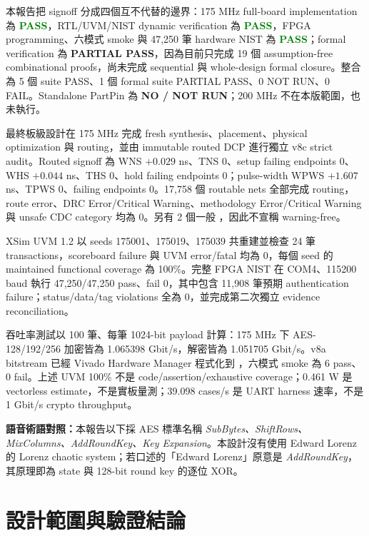 \documentclass[UTF8,fontset=none,11pt,a4paper]{ctexrep}
\newcommand{\pass}{\textcolor{green}{\textbf{PASS}}}
\newcommand{\code}[1]{\texttt{\detokenize{#1}}}
\begin{document}
本報告把 signoff 分成四個互不代替的邊界：175 MHz full-board implementation 為 \pass，RTL/UVM/NIST dynamic verification 為 \pass，FPGA programming、六模式 smoke 與 47,250 筆 hardware NIST 為 \pass；formal verification 為 \textbf{PARTIAL PASS}，因為目前只完成 19 個 assumption-free combinational proofs，尚未完成 sequential 與 whole-design formal closure。整合 \code{run_all} 為 5 個 suite PASS、1 個 formal suite PARTIAL PASS、0 NOT RUN、0 FAIL。Standalone PartPin 為 \textbf{NO / NOT RUN}；200 MHz 不在本版範圍，也未執行。

最終板級設計在 175 MHz 完成 fresh synthesis、placement、physical optimization 與 routing，並由 immutable routed DCP 進行獨立 v8c strict audit。Routed signoff 為 WNS $+0.029$ ns、TNS $0$、setup failing endpoints $0$、WHS $+0.044$ ns、THS $0$、hold failing endpoints $0$；pulse-width WPWS $+1.607$ ns、TPWS $0$、failing endpoints $0$。17,758 個 routable nets 全部完成 routing，route error、DRC Error/Critical Warning、methodology Error/Critical Warning 與 unsafe CDC category 均為 0。另有 2 個一般 \code{SYNTH-6 Warning}，因此不宣稱 warning-free。

XSim UVM 1.2 以 seeds 175001、175019、175039 共重建並檢查 24 筆 transactions，scoreboard failure 與 UVM error/fatal 均為 0，每個 seed 的 maintained functional coverage 為 100\%。完整 FPGA NIST 在 COM4、115200 baud 執行 47,250/47,250 pass、fail 0，其中包含 11,908 筆預期 authentication failure；status/data/tag violations 全為 0，並完成第二次獨立 evidence reconciliation。

吞吐率測試以 100 筆、每筆 1024-bit payload 計算：175 MHz 下 AES-128/192/256 加密皆為 1.065398 Gbit/s，解密皆為 1.051705 Gbit/s。v8a bitstream 已經 Vivado Hardware Manager 程式化到 \code{xc7a100t_0}，六模式 smoke 為 6 pass、0 fail。上述 UVM 100\% 不是 code/assertion/exhaustive coverage；0.461 W 是 vectorless estimate，不是實板量測；39.098 cases/s 是 UART harness 速率，不是 1 Gbit/s crypto throughput。

\vspace{3mm}
\noindent\colorbox{lightorange}{\parbox{0.95\linewidth}{
\textbf{語音術語對照：}本報告以下採 AES 標準名稱 \emph{SubBytes、ShiftRows、MixColumns、AddRoundKey、Key Expansion}。本設計沒有使用 Edward Lorenz 的 Lorenz chaotic system；若口述的「Edward Lorenz」原意是 \emph{AddRoundKey}，其原理即為 state 與 128-bit round key 的逐位 XOR。
}}

\tableofcontents
\listoffigures
\listoftables
\clearpage
{}

\chapter{設計範圍與驗證結論}
\end{document}
